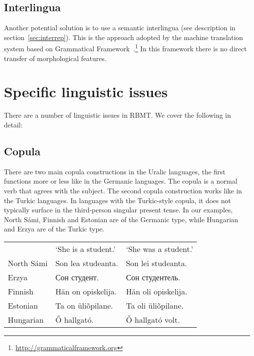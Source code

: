 \documentclass[free]{flammie}
\begin{document}
\subsection{Interlingua}

Another potential solution is to use a semantic interlingua (see description in section~\ref{sec:interrep}). This is the approach adopted by the machine translation system based on Grammatical Framework~\cite{ranta2011grammatical}.\footnote{\url{http://grammaticalframework.org}} In this framework there is no direct transfer of morphological features.

\section{Specific linguistic issues}

There are a number of linguistic issues in RBMT.
We cover the following in detail:

\subsection{Copula}

There are two main copula constructions in the Uralic languages, the first functions more or less like in the Germanic languages. The copula is a normal verb that agrees with the subject. The second copula construction works like in the Turkic languages. In languages with the Turkic-style copula, it does not typically surface in the third-person singular present tense. In our examples, North Sámi, Finnish and Estonian are of the Germanic type, while Hungarian and Erzya are of the Turkic type.

\begin{center}
\begin{scriptsize}
\begin{tabular}{lll}
   & `She is a student.' & `She was a student.' \\
North Sámi & Son lea studeanta. & Son lei studeanta. \\
Erzya & Сон студент. & Сон студентель.  \\
Finnish & Hän on opiskelija. & Hän oli opiskelija. \\
Estonian & Ta on üliõpilane. & Ta oli üliõpilane. \\
Hungarian & Ő hallgató. & Ő hallgató volt. \\
\end{tabular}
\end{scriptsize}
\end{center}
\end{document}

